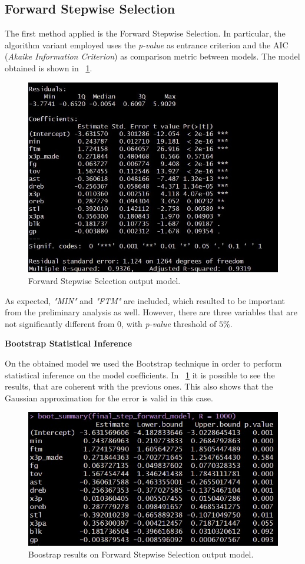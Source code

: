 \subsection{Forward Stepwise Selection}

The first method applied is the Forward Stepwise Selection. In particular, the algorithm variant employed uses the \textit{p-value} as entrance criterion and the AIC (\textit{Akaike Information Criterion}) as comparison metric between models. The model obtained is shown in \Fig~\ref{fig:ForwardModelSummary}.
\begin{figure}[h]
	\centering
	\includegraphics[width=0.35\linewidth]{ImageFiles/Regression/Forward/ForwardModelSummary}
	\caption{Forward Stepwise Selection output model.}
	\label{fig:ForwardModelSummary}
\end{figure}

As expected, \textit{"MIN"} and \textit{"FTM"} are included, which resulted to be important from the preliminary analysis as well. However, there are three variables that are not significantly different from 0, with \textit{p-value} threshold of $5\%$.

\vspace{0.2cm}
\noindent
\textbf{Bootstrap Statistical Inference}

On the obtained model we used the Bootstrap technique in order to perform statistical inference on the model coefficients. In \Fig~\ref{fig:ForwardModelSummary} it is possible to see the results, that are coherent with the previous ones. This also shows that the Gaussian approximation for the error is valid in this case.
\begin{figure}[h]
	\centering
	\includegraphics[width=0.4\linewidth]{ImageFiles/Regression/Forward/BootForwardModel}
	\caption{Boostrap results on Forward Stepwise Selection output model.}
	\label{fig:BootForwardModel}
\end{figure}

